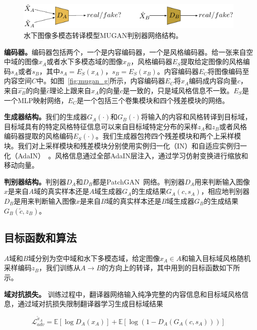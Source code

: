 \begin{figure}[ht]
    \centering
    \includegraphics[width=1\textwidth]{figures/D.pdf}
    \caption{水下图像多模态转译模型MUGAN判别器网络结构。}
    \label{fig:mugan_d}
\end{figure}

\textbf{编码器。}编码器包括两个，一个是内容编码器，一个是风格编码器。给一张来自空中域的图像$x_A$或者水下多模态域的图像$x_B$，风格编码器$E_S$提取给定图像的风格编码$s_A$或者$s_B$，其中$s_A = E_S(x_A)$，$s_B = E_S(x_B)$。内容编码器$E_C$将图像编码至内容空间$C$中。如图~\ref{fig:mugan_g}所示，内容编码器$E_C$将$x_A$编码成内容向量$c$，来自$\hat{x_B}$的向量$\hat{c}$理论上跟来自$x_A$的向量$c$是一致的，只是域风格信息不一致。$E_S$是一个MLP映射网络，$E_C$是一个包括三个卷集模块和四个残差模块的网络。

\textbf{生成器结构。}我们的生成器$G_A(\cdot)$和$G_B(\cdot)$将输入的内容和风格转译到目标域，目标域具有的特定风格特征信息可以来自目标域特定分布的采样$z_A$和$z_B$或者风格编码器提取的风格编码$E_S(\cdot)$。我们生成器包挎四个残差模块和两个上采样模块。我们对上采样模块和残差模块分别使用实例归一化（IN）和自适应实例归一化（AdaIN）~\cite{huang2017arbitrary}。风格信息通过全部AdaIN层注入，通过学习仿射变换进行缩放和移动向量。

\textbf{判别器结构。}判别器$D_A$和$D_B$都是PatchGAN~\cite{isola2017image}网络。判别器$D_A$用来判断输入图像$x$是来自$A$域的真实样本还是$A$域生成器$G_A$的生成结果$G_A(c,s_A)$，相应地判别器$D_B$是用来判断输入图像$x$是来自$B$域的真实样本还是$B$域生成器$G_B$的生成结果$G_B(\tilde{c},z_B)$。

\subsection{目标函数和算法}
$A$域和$B$域分别为空中域和水下多模态域，给定图像$x_A \in A$和输入目标域风格随机采样编码$z_B$，我们训练从$A \rightarrow B$的方向上的转译，其中用到的目标函数如下所示。

\textbf{域对抗损失。} 训练过程中，翻译器网络输入纯净完整的内容信息和目标域风格信息，通过域对抗损失限制翻译器学习生成目标域结果

\begin{equation}
\label{equ:adv_a_}
\mathcal{L}_{adv}^{\tilde{x}_A} = \mathbb{E}[\log D_A(x_A)] + \mathbb{E}[\log(1-D_A(G_A(c,s_A)))]
\end{equation}

